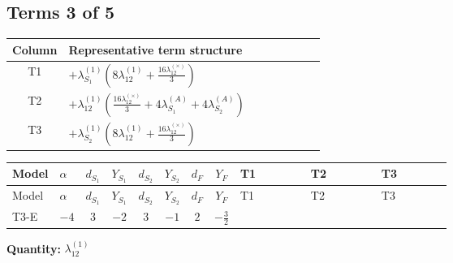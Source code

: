 \documentclass[8pt]{article}
\begin{document}
\begin{landscape}
\subsection*{Terms 3 of 5}
\begin{center}
\begin{tabular}{@{}c >{\raggedright\arraybackslash}p{0.82\linewidth}@{}}
\toprule
Column & Representative term structure \\
\midrule
T1 & \(\displaystyle +{\lambda_{S_1}^{(1)}} \left(8 {\lambda_{12}^{(1)}}+\frac{16 {\lambda_{12}^{(\times)}}}{3}\right)\) \\
\midrule
T2 & \(\displaystyle +{\lambda_{12}^{(1)}} \left(\frac{16 {\lambda_{12}^{(\times)}}}{3}+4 {\lambda_{S_1}^{(A)}}+4 {\lambda_{S_2}^{(A)}}\right)\) \\
\midrule
T3 & \(\displaystyle +{\lambda_{S_2}^{(1)}} \left(8 {\lambda_{12}^{(1)}}+\frac{16 {\lambda_{12}^{(\times)}}}{3}\right)\) \\
\midrule
\bottomrule
\end{tabular}
\end{center}
\smallskip
\tiny
\begin{longtable}{@{}llcccccc >{\raggedright\arraybackslash}p{0.21\linewidth} >{\raggedright\arraybackslash}p{0.21\linewidth} >{\raggedright\arraybackslash}p{0.21\linewidth}@{}}
\toprule
Model & $\alpha$ & $d_{S_1}$ & $Y_{S_1}$ & $d_{S_2}$ & $Y_{S_2}$ & $d_F$ & $Y_F$ & T1 & T2 & T3 \\
\midrule
\endfirsthead
\toprule
Model & $\alpha$ & $d_{S_1}$ & $Y_{S_1}$ & $d_{S_2}$ & $Y_{S_2}$ & $d_F$ & $Y_F$ & T1 & T2 & T3 \\
\midrule
\endhead
T3-E & $-4$ & $3$ & $-2$ & $3$ & $-1$ & $2$ & $-\frac{3}{2}$ & \scriptsize\adjustbox{max width=\linewidth}{$\begin{gathered} +{\lambda_{S_1}^{(1)}} \left(8 {\lambda_{12}^{(1)}}+\frac{16 {\lambda_{12}^{(\times)}}}{3}\right)\end{gathered}$} & \scriptsize\adjustbox{max width=\linewidth}{$\begin{gathered} +{\lambda_{12}^{(1)}} \left(\frac{16 {\lambda_{12}^{(\times)}}}{3}+4 {\lambda_{S_1}^{(A)}}+4 {\lambda_{S_2}^{(A)}}\right)\end{gathered}$} & \scriptsize\adjustbox{max width=\linewidth}{$\begin{gathered} +{\lambda_{S_2}^{(1)}} \left(8 {\lambda_{12}^{(1)}}+\frac{16 {\lambda_{12}^{(\times)}}}{3}\right)\end{gathered}$} \\
\midrule
\bottomrule
\end{longtable}
\clearpage
\noindent\textbf{Quantity: }$\lambda_{12}^{(1)}$\par\smallskip

\end{landscape}
\end{document}
